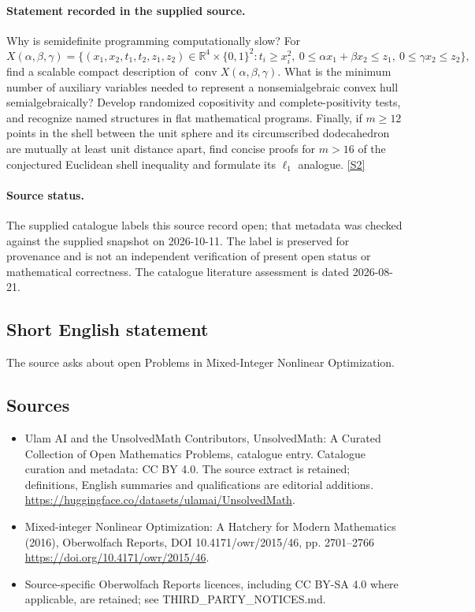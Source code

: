 \documentclass[11pt]{article}
\begin{document}
\paragraph{Statement recorded in the supplied source.}
Why is semidefinite programming computationally slow? For
$$X(\alpha,\beta,\gamma)=\{(x_1,x_2,t_1,t_2,z_1,z_2)\in\mathbb R^4\times\{0,1\}^2:t_i\geq x_i^2,\ 0\leq\alpha x_1+\beta x_2\leq z_1,\ 0\leq\gamma x_2\leq z_2\},$$
find a scalable compact description of $\operatorname{conv}X(\alpha,\beta,\gamma)$. What is the minimum number of auxiliary variables needed to represent a nonsemialgebraic convex hull semialgebraically? Develop randomized copositivity and complete-positivity tests, and recognize named structures in flat mathematical programs. Finally, if $m\geq12$ points in the shell between the unit sphere and its circumscribed dodecahedron are mutually at least unit distance apart, find concise proofs for $m>16$ of the conjectured Euclidean shell inequality and formulate its $\ell_1$ analogue. \href{https://doi.org/10.4171/owr/2015/46}{[S2]}
\paragraph{Source status.}
The supplied catalogue labels this source record open; that metadata was checked against the supplied snapshot on 2026-10-11. The label is preserved for provenance and is not an independent verification of present open status or mathematical correctness. The catalogue literature assessment is dated 2026-08-21.
\subsection{Short English statement}
The source asks about open Problems in Mixed-Integer Nonlinear Optimization.
\subsection{Sources}
\begin{itemize}
\item[S1] Ulam AI and the UnsolvedMath Contributors, UnsolvedMath: A Curated Collection of Open Mathematics Problems, catalogue entry. Catalogue curation and metadata: CC BY 4.0. The source extract is retained; definitions, English summaries and qualifications are editorial additions.
\url{https://huggingface.co/datasets/ulamai/UnsolvedMath}.
\item[S2] Mixed-integer Nonlinear Optimization: A Hatchery for Modern Mathematics (2016), Oberwolfach Reports, DOI 10.4171/owr/2015/46, pp. 2701--2766
\url{https://doi.org/10.4171/owr/2015/46}.
\item Source-specific Oberwolfach Reports licences, including CC BY-SA 4.0 where applicable, are retained; see THIRD\_PARTY\_NOTICES.md.
\end{itemize}
\end{document}
